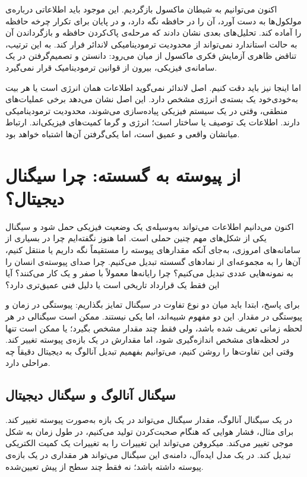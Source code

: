 اکنون می‌توانیم به شیطان ماکسول بازگردیم. این موجود باید اطلاعاتی درباره‌ی مولکول‌ها به دست آورد، آن را در حافظه نگه دارد، و در پایان برای تکرار چرخه حافظه را آماده کند. تحلیل‌های بعدی نشان دادند که مرحله‌ی پاک‌کردن حافظه و بازگرداندن آن به حالت استاندارد نمی‌تواند از محدودیت ترمودینامیکی لاندائر فرار کند. به این ترتیب، تناقض ظاهری آزمایش فکری ماکسول از میان می‌رود: دانستن و تصمیم‌گرفتن در یک سامانه‌ی فیزیکی، بیرون از قوانین ترمودینامیک قرار نمی‌گیرد. \autocite{bennett1982,sep-information-entropy}

اما اینجا نیز باید دقت کنیم. اصل لاندائر نمی‌گوید اطلاعات همان انرژی است یا هر بیت به‌خودی‌خود یک بسته‌ی انرژی مشخص دارد. این اصل نشان می‌دهد برخی عملیات‌های منطقی، وقتی در یک سیستم فیزیکی پیاده‌سازی می‌شوند، محدودیت ترمودینامیکی دارند. اطلاعات یک توصیف یا ساختار است؛ انرژی و گرما کمیت‌های فیزیکی‌اند. ارتباط میانشان واقعی و عمیق است، اما یکی‌گرفتن آن‌ها اشتباه خواهد بود.

\section{از پیوسته به گسسته: چرا سیگنال دیجیتال؟}
\label{sec:continuous-to-discrete}

اکنون می‌دانیم اطلاعات می‌تواند به‌وسیله‌ی یک وضعیت فیزیکی حمل شود و سیگنال یکی از شکل‌های مهم چنین حملی است. اما هنوز نگفته‌ایم چرا در بسیاری از سامانه‌های امروزی، به‌جای آنکه مقدارهای پیوسته را مستقیماً نگه داریم یا منتقل کنیم، آن‌ها را به مجموعه‌ای از نمادهای گسسته تبدیل می‌کنیم. چرا صدای پیوسته‌ی انسان را به نمونه‌هایی عددی تبدیل می‌کنیم؟ چرا رایانه‌ها معمولاً با صفر و یک کار می‌کنند؟ آیا این فقط یک قرارداد تاریخی است یا دلیل فنی عمیق‌تری دارد؟

برای پاسخ، ابتدا باید میان دو نوع تفاوت در سیگنال تمایز بگذاریم: پیوستگی در زمان و پیوستگی در مقدار. این دو مفهوم شبیه‌اند، اما یکی نیستند. ممکن است سیگنالی در هر لحظه زمانی تعریف شده باشد، ولی فقط چند مقدار مشخص بگیرد؛ یا ممکن است تنها در لحظه‌های مشخص اندازه‌گیری شود، اما مقدارش در یک بازه‌ی پیوسته تغییر کند. وقتی این تفاوت‌ها را روشن کنیم، می‌توانیم بفهمیم تبدیل آنالوگ به دیجیتال دقیقاً چه مراحلی دارد.

\subsection{سیگنال آنالوگ و سیگنال دیجیتال}
\label{sub:analog-digital-signals}

در یک سیگنال آنالوگ، مقدار سیگنال می‌تواند در یک بازه به‌صورت پیوسته تغییر کند. برای مثال، فشار هوایی که هنگام صحبت‌کردن تولید می‌کنیم، در طول زمان به شکل موجی تغییر می‌کند. میکروفن می‌تواند این تغییرات را به تغییرات یک کمیت الکتریکی تبدیل کند. در یک مدل ایده‌آل، دامنه‌ی این سیگنال می‌تواند هر مقداری در یک بازه‌ی پیوسته داشته باشد؛ نه فقط چند سطح از پیش تعیین‌شده.

